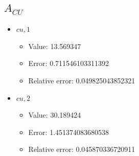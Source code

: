 \documentclass{article}%
\begin{document}
\subsection{$A_{CU}$}%
\begin{itemize}%
	\item $\textit{cu},1$%
	\begin{itemize}%
		\item Value: 13.569347%
		\item Error: 0.711546103311392%
		\item Relative error: 0.049825043852321%
	\end{itemize}%
	\item $\textit{cu},2$%
	\begin{itemize}%
		\item Value: 30.189424%
		\item Error: 1.451374083680538%
		\item Relative error: 0.045870336720911%
	\end{itemize}%
\end{itemize}%
\end{document}
